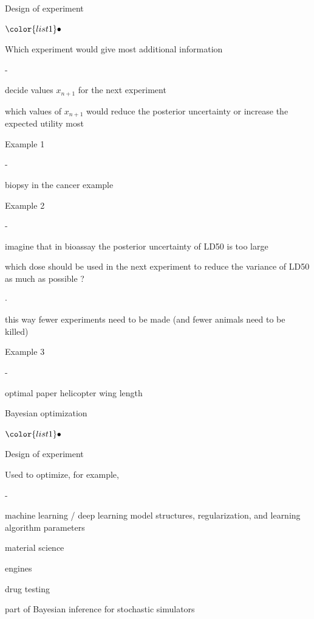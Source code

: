\documentclass[t]{beamer}
\newenvironment{list1}{
   \begin{list}{$\color{list1}\bullet$}{\itemsep=6pt}}{
  \end{list}}
\newenvironment{list2}{
  \begin{list}{-}{\baselineskip=12pt\itemsep=2pt}}{
  \end{list}}
\newenvironment{list3}{
  \begin{list}{$\cdot$}{\baselineskip=15pt}}{
  \end{list}}
\begin{document}
\begin{frame}{Design of experiment}

  \begin{list1}
  \item Which experiment would give most additional information
    \begin{list2}
    \item decide values $x_{n+1}$ for the next experiment
    \item which values of $x_{n+1}$ would reduce the posterior
      uncertainty or increase the expected utility most
    \end{list2}
  \item<2-> Example 1
    \begin{list2}
      \item biopsy in the cancer example
    \end{list2}
  \item<3-> Example 2
    \begin{list2}
    \item imagine that in bioassay the posterior uncertainty of LD50 is too large
    \item which dose should be used in the next experiment to reduce
      the variance of LD50 as much as possible ?
      \begin{list3}
        \item this way fewer experiments need to be made (and fewer animals need to be killed)
      \end{list3}
    \end{list2}
  \item<4-> Example 3
    \begin{list2}
      \item optimal paper helicopter wing length
    \end{list2}
  \end{list1}
\end{frame}

\begin{frame}{Bayesian optimization}

  \begin{list1}
  \item Design of experiment
  \item Used to optimize, for example,
    \begin{list2}
    \item machine learning / deep learning model structures,
      regularization, and learning algorithm parameters
    \item material science
    \item engines
    \item drug testing
    \item part of Bayesian inference for stochastic simulators
    \end{list2}
  \end{list1}

\end{frame}
\end{document}
